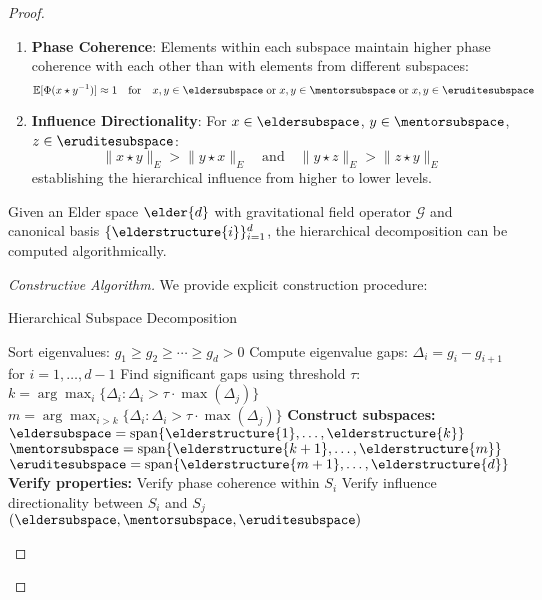 \begin{proof}
\begin{definition}
\begin{enumerate}
    \item \textbf{Phase Coherence}: Elements within each subspace maintain higher phase coherence with each other than with elements from different subspaces:
    \begin{equation}
    \mathbb{E}[\Phi(x \star y^{-1})] \approx 1 \quad \text{for} \quad x,y \in \eldersubspace \; \text{or} \; x,y \in \mentorsubspace \; \text{or} \; x,y \in \eruditesubspace
    \end{equation}
    
    \item \textbf{Influence Directionality}: For $x \in \eldersubspace$, $y \in \mentorsubspace$, $z \in \eruditesubspace$:
    \begin{equation}
    \|x \star y\|_E > \|y \star x\|_E \quad \text{and} \quad \|y \star z\|_E > \|z \star y\|_E
    \end{equation}
    establishing the hierarchical influence from higher to lower levels.
\end{enumerate}
\end{definition}

\begin{theorem}
\label{thm:hierarchical_decomposition_algorithm}
Given an Elder space $\elder{d}$ with gravitational field operator $\mathcal{G}$ and canonical basis $\{\elderstructure{i}\}_{i=1}^{d}$, the hierarchical decomposition can be computed algorithmically.
\end{theorem}

\begin{proof}[Constructive Algorithm]
We provide explicit construction procedure:

\begin{algorithm}[H]
\caption{Hierarchical Subspace Decomposition}
\begin{algorithmic}[1]
    \State Sort eigenvalues: $g_1 \geq g_2 \geq \cdots \geq g_d > 0$
    \State Compute eigenvalue gaps: $\Delta_i = g_i - g_{i+1}$ for $i = 1, \ldots, d-1$
    \State Find significant gaps using threshold $\tau$:
    \State $k = \arg\max_{i} \{\Delta_i : \Delta_i > \tau \cdot \max(\Delta_j)\}$
    \State $m = \arg\max_{i>k} \{\Delta_i : \Delta_i > \tau \cdot \max(\Delta_j)\}$
    \State \textbf{Construct subspaces:}
    \State $\eldersubspace = \mathrm{span}\{\elderstructure{1}, \ldots, \elderstructure{k}\}$
    \State $\mentorsubspace = \mathrm{span}\{\elderstructure{k+1}, \ldots, \elderstructure{m}\}$
    \State $\eruditesubspace = \mathrm{span}\{\elderstructure{m+1}, \ldots, \elderstructure{d}\}$
    \State \textbf{Verify properties:}
        \State Verify phase coherence within $S_i$
        \State Verify influence directionality between $S_i$ and $S_j$
    \EndFor
    \State \Return $(\eldersubspace, \mentorsubspace, \eruditesubspace)$
\EndProcedure
\end{algorithmic}
\end{algorithm}


\end{proof}
\end{proof}
